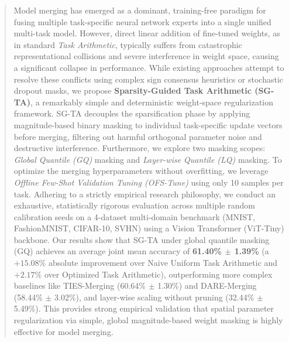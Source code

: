 \begin{abstract}
Model merging has emerged as a dominant, training-free paradigm for fusing multiple task-specific neural network experts into a single unified multi-task model. However, direct linear addition of fine-tuned weights, as in standard \emph{Task Arithmetic}, typically suffers from catastrophic representational collisions and severe interference in weight space, causing a significant collapse in performance. While existing approaches attempt to resolve these conflicts using complex sign consensus heuristics or stochastic dropout masks, we propose \textbf{Sparsity-Guided Task Arithmetic (SG-TA)}, a remarkably simple and deterministic weight-space regularization framework. SG-TA decouples the sparsification phase by applying magnitude-based binary masking to individual task-specific update vectors before merging, filtering out harmful orthogonal parameter noise and destructive interference. Furthermore, we explore two masking scopes: \emph{Global Quantile (GQ)} masking and \emph{Layer-wise Quantile (LQ)} masking. To optimize the merging hyperparameters without overfitting, we leverage \emph{Offline Few-Shot Validation Tuning (OFS-Tune)} using only 10 samples per task. Adhering to a strictly empirical research philosophy, we conduct an exhaustive, statistically rigorous evaluation across multiple random calibration seeds on a 4-dataset multi-domain benchmark (MNIST, FashionMNIST, CIFAR-10, SVHN) using a Vision Transformer (ViT-Tiny) backbone. Our results show that SG-TA under global quantile masking (GQ) achieves an average joint mean accuracy of \textbf{61.40\% $\pm$ 1.39\%} (a $+15.08\%$ absolute improvement over Naive Uniform Task Arithmetic and $+2.17\%$ over Optimized Task Arithmetic), outperforming more complex baselines like TIES-Merging (60.64\% $\pm$ 1.30\%) and DARE-Merging (58.44\% $\pm$ 3.02\%), and layer-wise scaling without pruning (32.44\% $\pm$ 5.49\%). This provides strong empirical validation that spatial parameter regularization via simple, global magnitude-based weight masking is highly effective for model merging.
\end{abstract}
